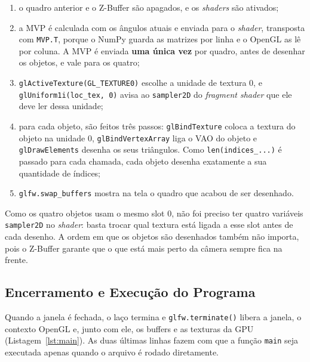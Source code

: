 \documentclass{article}
\begin{document}
\begin{enumerate}
    \item o quadro anterior e o Z-Buffer são apagados, e os \textit{shaders} são ativados;
    \item a MVP é calculada com os ângulos atuais e enviada para o \textit{shader}, transposta com \texttt{MVP.T}, porque o NumPy guarda as matrizes por linha e o OpenGL as lê por coluna. A MVP é enviada \textbf{uma única vez} por quadro, antes de desenhar os objetos, e vale para os quatro;
    \item \texttt{glActiveTexture(GL\_TEXTURE0)} escolhe a unidade de textura 0, e \texttt{glUniform1i(loc\_tex, 0)} avisa ao \texttt{sampler2D} do \textit{fragment shader} que ele deve ler dessa unidade;
    \item para cada objeto, são feitos três passos: \texttt{glBindTexture} coloca a textura do objeto na unidade 0, \texttt{glBindVertexArray} liga o VAO do objeto e \texttt{glDrawElements} desenha os seus triângulos. Como \texttt{len(indices\_...)} é passado para cada chamada, cada objeto desenha exatamente a sua quantidade de índices;
    \item \texttt{glfw.swap\_buffers} mostra na tela o quadro que acabou de ser desenhado.
\end{enumerate}

Como os quatro objetos usam o mesmo slot 0, não foi preciso ter quatro variáveis \texttt{sampler2D} no \textit{shader}: basta trocar qual textura está ligada a esse slot antes de cada desenho. A ordem em que os objetos são desenhados também não importa, pois o Z-Buffer garante que o que está mais perto da câmera sempre fica na frente.



\subsection{Encerramento e Execução do Programa}

Quando a janela é fechada, o laço termina e \texttt{glfw.terminate()} libera a janela, o contexto OpenGL e, junto com ele, os buffers e as texturas da GPU (Listagem~\ref{lst:main}). As duas últimas linhas fazem com que a função \texttt{main} seja executada apenas quando o arquivo é rodado diretamente.


\end{document}
